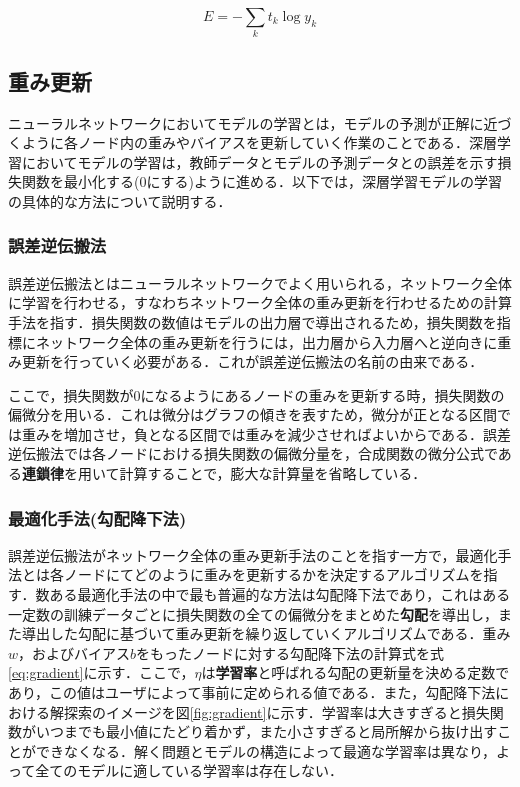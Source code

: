 \documentclass[a4j, 11pt]{jreport}
\begin{document}
\begin{equation}
	E = -\sum_{k}t_{k}\log y_{k}
	\label{eq:cee}
\end{equation}

\subsection{重み更新}
ニューラルネットワークにおいてモデルの学習とは，モデルの予測が正解に近づくように各ノード内の重みやバイアスを更新していく作業のことである．深層学習においてモデルの学習は，教師データとモデルの予測データとの誤差を示す損失関数を最小化する(0にする)ように進める．以下では，深層学習モデルの学習の具体的な方法について説明する．
\subsubsection{誤差逆伝搬法}
誤差逆伝搬法とはニューラルネットワークでよく用いられる，ネットワーク全体に学習を行わせる，すなわちネットワーク全体の重み更新を行わせるための計算手法を指す．損失関数の数値はモデルの出力層で導出されるため，損失関数を指標にネットワーク全体の重み更新を行うには，出力層から入力層へと逆向きに重み更新を行っていく必要がある．これが誤差逆伝搬法の名前の由来である．

ここで，損失関数が0になるようにあるノードの重みを更新する時，損失関数の偏微分を用いる．これは微分はグラフの傾きを表すため，微分が正となる区間では重みを増加させ，負となる区間では重みを減少させればよいからである．誤差逆伝搬法では各ノードにおける損失関数の偏微分量を，合成関数の微分公式である\textbf{連鎖律}を用いて計算することで，膨大な計算量を省略している．
\subsubsection{最適化手法(勾配降下法)}
誤差逆伝搬法がネットワーク全体の重み更新手法のことを指す一方で，最適化手法とは各ノードにてどのように重みを更新するかを決定するアルゴリズムを指す．数ある最適化手法の中で最も普遍的な方法は勾配降下法であり，これはある一定数の訓練データごとに損失関数の全ての偏微分をまとめた\textbf{勾配}を導出し，また導出した勾配に基づいて重み更新を繰り返していくアルゴリズムである．重み$w$，およびバイアス$b$をもったノードに対する勾配降下法の計算式を式\ref{eq:gradient}に示す．ここで，$\eta$は\textbf{学習率}と呼ばれる勾配の更新量を決める定数であり，この値はユーザによって事前に定められる値である．また，勾配降下法における解探索のイメージを図\ref{fig:gradient}に示す．学習率は大きすぎると損失関数がいつまでも最小値にたどり着かず，また小さすぎると局所解から抜け出すことができなくなる．解く問題とモデルの構造によって最適な学習率は異なり，よって全てのモデルに適している学習率は存在しない．
\end{document}
